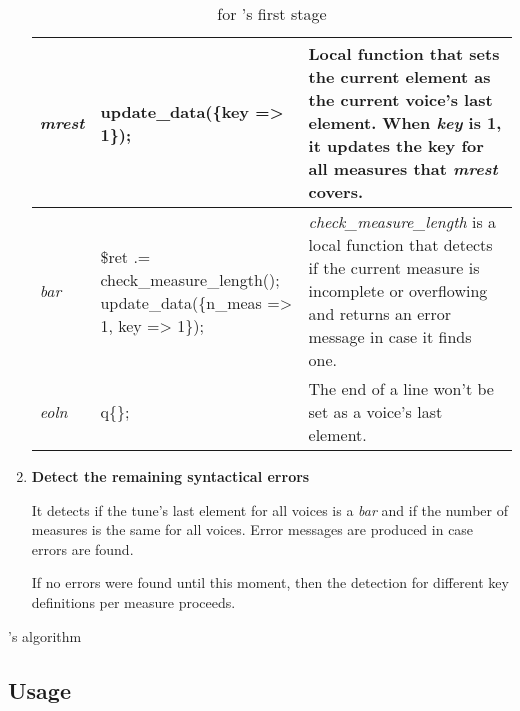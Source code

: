 \begin{enumerate}
\begin{center}
\begin{table}[h]
\begin{tabular}{|p{2cm}|p{6cm}|p{7.5cm}|}
        \hline
        \emph{mrest} & update\_data(\{key => 1\}); & Local function that sets the current element as
        the current voice's last \abc{} element. When \emph{key} is 1, it updates the key for all
        measures that \emph{mrest} covers.
        \\
        \hline

        \hline
        \emph{bar} & \$ret .= check\_measure\_length(); update\_data(\{n\_meas => 1, key => 1\}); &
        \emph{check\_measure\_length} is a local function that detects if the current measure is
        incomplete or overflowing and returns an error message in case it finds one.
        \\
        \hline

        \hline
        \emph{eoln} & q\{\}; & The end of a line won't be set as a voice's last element.
        \\
        \hline
      \end{tabular}
      \caption{\abcdtrules{} for \detecterrorsabc{}'s first stage}
      \label{tab:detect_errors_abc_fst_stage}
    \end{table}
  \end{center}

  \item \textbf{Detect the remaining syntactical errors}

  It detects if the tune's last \abc{} element for all voices is a \emph{bar} and if the number of
  measures is the same for all voices. Error messages are produced in case errors are found.

  If no errors were found until this moment, then the detection for different key definitions per
  measure proceeds.
\end{enumerate}

\begin{algorithm}[H]
  \caption{\detecterrorsabc{}'s algorithm}
  \label{alg:detecterrorsabc}
\end{algorithm}

\subsection*{Usage}

